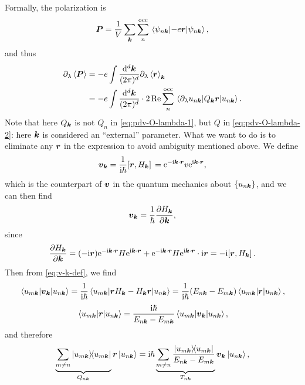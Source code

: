 \documentclass[hyperref, a4paper]{article}
\newcommand*{\ii}{\mathrm{i}}
\newcommand*{\ee}{\mathrm{e}}
\begin{document}
Formally, the polarization is 
\begin{equation}
    \vb*{P} = \frac{1}{V} \sum_{\vb*{k}} \sum_{n}^{\text{occ}} \expval{- e \vb*{r}}{\psi_{n \vb*{k}}},
\end{equation}
and thus 
\begin{equation}
    \begin{aligned}
        \partial_\lambda \expval{\vb*{P}} &= 
        - e \int \frac{\dd[d]{\vb*{k}}}{(2\pi)^d} 
        \partial_\lambda \expval{\vb*{r}}_{\vb*{k}} \\
        &= - e \int \frac{\dd[d]{\vb*{k}}}{(2\pi)^d} 
        \cdot 2 \Re \sum_{n}^{\text{occ}} \mel{\partial_\lambda u_{n \vb*{k}}}{Q_{\vb*{k}} \vb*{r}}{u_{n \vb*{k}}}.
    \end{aligned}
    \label{eq:change-of-p-1}
\end{equation}
Note that here $Q_{\vb*{k}}$ is not $Q_{n}$ in \eqref{eq:pdv-O-lambda-1},
but $Q$ in \eqref{eq:pdv-O-lambda-2}: 
here $\vb*{k}$ is considered an ``external'' parameter.
What we want to do is to eliminate any $\vb*{r}$ in the expression 
to avoid ambiguity mentioned above. 
We define 
\begin{equation}
    \vb*{v}_{\vb*{k}} = \frac{1}{\ii \hbar} \comm*{\vb*{r}}{H_{\vb*{k}}}
    = \ee^{- \ii \vb*{k} \cdot \vb*{r}} v \ee^{\ii \vb*{k} \cdot \vb*{r}},
    \label{eq:v-k-def}
\end{equation}
which is the counterpart of $\vb*{v}$ 
in the quantum mechanics about $\{u_{n \vb*{k}}\}$,
and we can then find 
\begin{equation}
    \vb*{v}_{\vb*{k}} = \frac{1}{\hbar} \pdv{H_{\vb*{k}}}{\vb*{k}},
    \label{eq:v-is-pdv-h-k}
\end{equation}
since 
\[
    \pdv{H_{\vb*{k}}}{\vb*{k}}
    = (- \ii \vb*{r}) \ee^{- \ii \vb*{k} \cdot \vb*{r}}  H \ee^{\ii \vb*{k} \cdot \vb*{r}}
    + \ee^{- \ii \vb*{k} \cdot \vb*{r}} H \ee^{\ii \vb*{k} \cdot \vb*{r}} \cdot \ii \vb*{r}
    = - \ii \comm*{\vb*{r}}{H_{\vb*{k}}} .
\]
Then from \eqref{eq:v-k-def}, we find 
\[
    \mel{u_{m \vb*{k}}}{\vb*{v}_{\vb*{k}}}{u_{n \vb*{k}}}
    = \frac{1}{\ii \hbar} \mel{u_{m \vb*{k}}}{\vb*{r} H_{\vb*{k}} - H_{\vb*{k}} \vb*{r}}{u_{n \vb*{k}}}
    = \frac{1}{\ii \hbar} (E_{n \vb*{k}} - E_{m \vb*{k}}) 
    \mel{u_{m \vb*{k}}}{\vb*{r}}{u_{n \vb*{k}}},
\]
\[
    \mel{u_{m \vb*{k}}}{\vb*{r}}{u_{n \vb*{k}}} = \frac{\ii \hbar}{E_{n \vb*{k}} - E_{m \vb*{k}}}
    \mel{u_{m \vb*{k}}}{\vb*{v}_{\vb*{k}}}{u_{n \vb*{k}}},
\]
and therefore 
\[
    \underbrace{\sum_{m \neq n} \dyad{u_{m \vb*{k}}}}_{Q_{n \vb*{k}}} \vb*{r} \ket{u_{n \vb*{k}}}
    = \ii \hbar \underbrace{
        \sum_{m \neq n} \frac{\dyad{u_{m \vb*{k}}}}{E_{n \vb*{k}} - E_{m \vb*{k}}} 
    }_{T_{n \vb*{k}}}
    \vb*{v}_{\vb*{k}} \ket{u_{n \vb*{k}}},
\]
\end{document}
